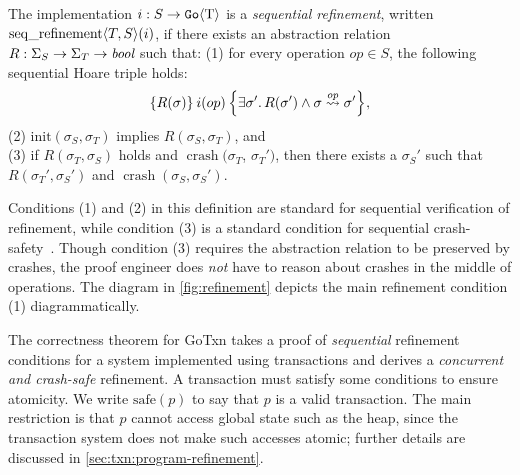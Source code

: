 \begin{definition}
  The implementation $i : S \to \mathtt{Go}\langle \mathrm{T} \rangle$ is a \emph{sequential
    refinement}, written
  $\operatorname{seq\_refinement} \langle T, S \rangle(i)$, if there exists an abstraction relation
  $R : \Sigma_{S} \to \Sigma_{T} \to \textit{bool}$ such that: \newline
(1) for every operation
  $op \in S$, the following sequential Hoare triple holds:
  \[
    \hoare{R(\sigma)}{i(op)}{\exists \sigma'.\, R(\sigma') \land \sigma \overset{op}{\leadsto} \sigma'},
  \]
(2) $\mathrm{init}(\sigma_{S}, \sigma_{T})$ implies
$R(\sigma_{S}, \sigma_{T})$, and \\
(3) if $R(\sigma_{T}, \sigma_{S})$ holds and $\operatorname{crash}(\sigma_{T}$, $\sigma_{T}')$,
then there exists a $\sigma_{S}'$ such that $R(\sigma_{T}', \sigma_{S}')$ and
$\operatorname{crash}(\sigma_{S}, \sigma_{S}')$.%
  \label{def:seqrefinement}
\end{definition}
%
Conditions (1) and (2) in this definition are standard for sequential
verification of refinement, while condition (3) is a standard condition for sequential crash-safety~\citep{chajed:argosy}. Though condition (3) requires the
abstraction relation to be preserved by crashes, the proof engineer does \emph{not} have to reason about crashes in the middle of operations.
The
diagram in \cref{fig:refinement} depicts the main
refinement condition (1) diagrammatically.

The correctness theorem for GoTxn takes a proof of \emph{sequential} refinement
conditions for a system implemented using transactions and derives a \emph{concurrent and crash-safe} refinement.
A transaction must satisfy some conditions to ensure atomicity. We write
$\mathrm{safe}(p)$ to say that $p$ is a valid transaction. The main
restriction is that $p$ cannot access global state such as the heap, since
the transaction system does not make such accesses atomic; further details are
discussed in \cref{sec:txn:program-refinement}.

